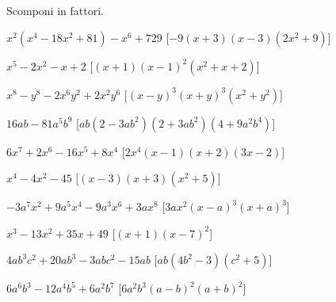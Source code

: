 
\begin{esercizio}[\Ast]
 \label{ese:17.24}
 Scomponi in fattori.
 \begin{enumeratea}
  \item $x^{2}(x^{4}-18x^{2}+81)-x^{6}+729$
  \hfill [$-9(x+3)(x-3)(2x^{2}+9)$]
\item $x^{5}-2x^{2}-x+2$
  \hfill [$(x+1)(x-1)^{2}(x^{2}+x+2)$]
\item $x^{8}-y^{8}-2x^{6}y^{2}+2x^{2}y^{6}$
  \hfill [$(x-y)^{3}(x+y)^{3}(x^{2}+y^{2})$]
\item $16ab-81a^{5}b^{9}$
  \hfill [${ab}(2-3{ab}^{2})(2+3{ab}^{2})(4+9a^{2}b^{4})$]
\item $6x^{7}+2x^{6}-16x^{5}+8x^{4}$
  \hfill [$2x^{4}(x-1)(x+2)(3x-2)$]
\item $x^{4}-4x^{2}-45$
  \hfill [$(x-3)(x+3)(x^{2}+5)$]
\item $-3a^{7}x^{2}+9a^{5}x^{4}-9a^{3}x^{6}+3ax^{8}$
  \hfill [$3ax^{2}(x-a)^{3}(x+a)^{3}$]
\item $x^{3}-13x^{2}+35x+49$
  \hfill [$(x+1)(x-7)^{2}$]
\item $4ab^{3}c^{2}+20ab^{3}-3abc^{2}-15ab$
  \hfill [${ab}(4b^{2}-3)(c^{2}+5)$]
\item $6a^{6}b^{3}-12a^{4}b^{5}+6a^{2}b^{7}$
  \hfill [$6a^{2}b^{3}(a-b)^{2}(a+b)^{2}$]
 \end{enumeratea}
\end{esercizio}

